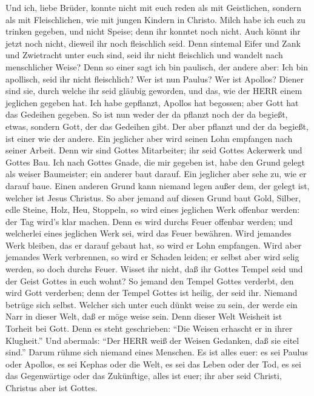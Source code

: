  Und ich, liebe Brüder, konnte nicht mit euch reden als mit
Geistlichen, sondern als mit Fleischlichen, wie mit jungen Kindern in
Christo.  Milch habe ich euch zu trinken gegeben, und nicht
Speise; denn ihr konntet noch nicht. Auch könnt ihr jetzt noch nicht,
 dieweil ihr noch fleischlich seid. Denn sintemal Eifer und
Zank und Zwietracht unter euch sind, seid ihr nicht fleischlich und
wandelt nach menschlicher Weise?  Denn so einer sagt ich bin
paulisch, der andere aber: Ich bin apollisch, seid ihr nicht
fleischlich?  Wer ist nun Paulus? Wer ist Apollos? Diener
sind sie, durch welche ihr seid gläubig geworden, und das, wie der HERR
einem jeglichen gegeben hat.  Ich habe gepflanzt, Apollos
hat begossen; aber Gott hat das Gedeihen gegeben.  So ist
nun weder der da pflanzt noch der da begießt, etwas, sondern Gott, der
das Gedeihen gibt.  Der aber pflanzt und der da begießt, ist
einer wie der andere. Ein jeglicher aber wird seinen Lohn empfangen nach
seiner Arbeit.  Denn wir sind Gottes Mitarbeiter; ihr seid
Gottes Ackerwerk und Gottes Bau.  Ich nach Gottes Gnade,
die mir gegeben ist, habe den Grund gelegt als weiser Baumeister; ein
anderer baut darauf. Ein jeglicher aber sehe zu, wie er darauf baue.
 Einen anderen Grund kann niemand legen außer dem, der
gelegt ist, welcher ist Jesus Christus.  So aber jemand auf
diesen Grund baut Gold, Silber, edle Steine, Holz, Heu, Stoppeln,
 so wird eines jeglichen Werk offenbar werden: der Tag
wird's klar machen. Denn es wird durchs Feuer offenbar werden; und
welcherlei eines jeglichen Werk sei, wird das Feuer bewähren.
 Wird jemandes Werk bleiben, das er darauf gebaut hat, so
wird er Lohn empfangen.  Wird aber jemandes Werk
verbrennen, so wird er Schaden leiden; er selbst aber wird selig werden,
so doch durchs Feuer.  Wisset ihr nicht, daß ihr Gottes
Tempel seid und der Geist Gottes in euch wohnt?  So jemand
den Tempel Gottes verderbt, den wird Gott verderben; denn der Tempel
Gottes ist heilig, der seid ihr.  Niemand betrüge sich
selbst. Welcher sich unter euch dünkt weise zu sein, der werde ein Narr
in dieser Welt, daß er möge weise sein.  Denn dieser Welt
Weisheit ist Torheit bei Gott. Denn es steht geschrieben: ``Die Weisen
erhascht er in ihrer Klugheit.''  Und abermals: ``Der HERR
weiß der Weisen Gedanken, daß sie eitel sind.''  Darum
rühme sich niemand eines Menschen. Es ist alles euer:  es
sei Paulus oder Apollos, es sei Kephas oder die Welt, es sei das Leben
oder der Tod, es sei das Gegenwärtige oder das Zukünftige, alles ist
euer;  ihr aber seid Christi, Christus aber ist Gottes.

